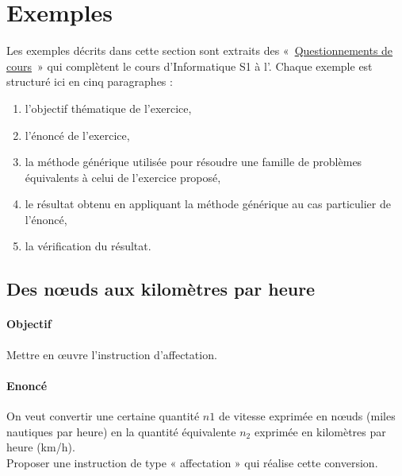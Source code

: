 \section{Exemples}\label{sec:exemples}

Les exemples décrits dans cette section sont extraits des 
«~\href{http://www.enib.fr/~tisseau/pdf/course/q-info-S1.pdf}{Questionnements de cours}~»
qui complètent le cours d'Informatique S1 à l'\enib.
Chaque exemple est structuré ici en cinq paragraphes : 
\begin{enumerate}
\item l'objectif thématique de l'exercice,
\item l'énoncé de l'exercice,
\item la méthode générique utilisée pour résoudre une famille de problèmes 
	équivalents à celui de l'exercice proposé, 
\item le résultat obtenu en appliquant la méthode générique au cas particulier de l'énoncé,
\item la vérification du résultat.
\end{enumerate}

\subsection{Des n\oe uds aux kilomètres par heure}\label{subsec:noeuds}
\paragraph{Objectif} Mettre en \oe uvre l'instruction d'affectation.

\paragraph{Enoncé}
On veut convertir une certaine quantité $n1$ de vitesse exprimée en n\oe uds 
(miles nautiques par heure) en la quantité équivalente $n_2$ exprimée en 
kilomètres par heure (km/h).\\
Proposer une instruction de type « affectation » qui réalise cette conversion.

